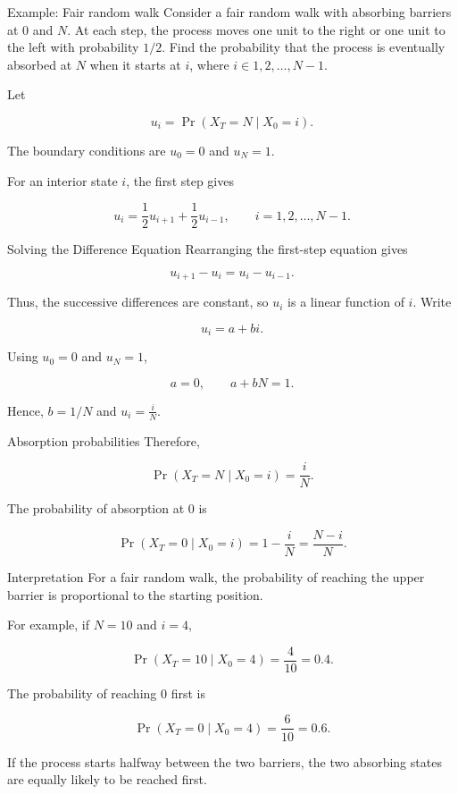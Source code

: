 \documentclass[
  ignorenonframetext,
  aspectratio=169,
]{beamer}
\begin{document}
\begin{frame}{Example: Fair random walk}
\protect{}\label{example-fair-random-walk}
Consider a fair random walk with absorbing barriers at \(0\) and \(N\).
At each step, the process moves one unit to the right or one unit to the
left with probability \(1/2\). Find the probability that the process is
eventually absorbed at \(N\) when it starts at \(i\), where
\(i\in{1,2,\ldots,N-1}\).

Let

\[
u_i=\Pr(X_T=N\mid X_0=i).
\]

The boundary conditions are \(u_0=0\) and \(u_N=1\).

For an interior state \(i\), the first step gives

\[
u_i=\frac12u_{i+1}+\frac12u_{i-1},
\qquad i=1,2,\ldots,N-1.
\]
\end{frame}

\begin{frame}{Solving the Difference Equation}
\protect{}\label{solving-the-difference-equation}
Rearranging the first-step equation gives

\[
u_{i+1}-u_i=u_i-u_{i-1}.
\]

Thus, the successive differences are constant, so \(u_i\) is a linear
function of \(i\). Write

\[
u_i=a+bi.
\]

Using \(u_0=0\) and \(u_N=1\),

\[
a=0,
\qquad
a+bN=1.
\]

Hence, \(b=1/N\) and \(\boxed{u_i=\frac{i}{N}}.\)
\end{frame}

\begin{frame}{Absorption probabilities}
\protect{}\label{absorption-probabilities-1}
Therefore,

\[
\boxed{\Pr(X_T=N\mid X_0=i)=\frac{i}{N}}.
\]

The probability of absorption at \(0\) is

\[
\boxed{
\Pr(X_T=0\mid X_0=i)
=
1-\frac{i}{N}
=
\frac{N-i}{N}
}.
\]
\end{frame}

\begin{frame}{Interpretation}
\protect{}\label{interpretation}
For a fair random walk, the probability of reaching the upper barrier is
proportional to the starting position.

For example, if \(N=10\) and \(i=4\),

\[
\Pr(X_T=10\mid X_0=4)=\frac4{10}=0.4.
\]

The probability of reaching \(0\) first is

\[
\Pr(X_T=0\mid X_0=4)=\frac6{10}=0.6.
\]

If the process starts halfway between the two barriers, the two
absorbing states are equally likely to be reached first.
\end{frame}
\end{document}
